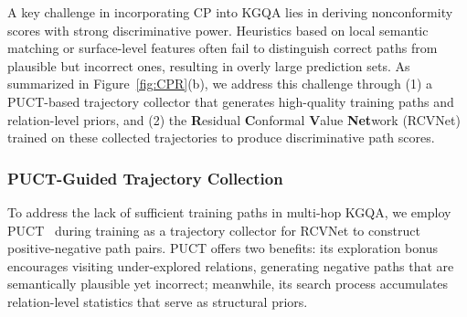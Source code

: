 \documentclass{article}
\newcommand{\sh}[1]{\textcolor{green}{[SH: #1]}}
\theoremstyle{plain}
\theoremstyle{definition}
\theoremstyle{remark}
\begin{document}
A key challenge in incorporating CP into KGQA lies in deriving nonconformity scores with strong discriminative power. Heuristics based on local semantic matching or surface-level features often fail to distinguish correct paths from plausible but incorrect ones, resulting in overly large prediction sets. As summarized in Figure~\ref{fig:CPR}(b), we address this challenge through (1) a PUCT-based trajectory collector that generates high-quality training paths and relation-level priors, and (2) the \textbf{R}esidual \textbf{C}onformal \textbf{V}alue \textbf{Net}work (RCVNet) trained on these collected trajectories to produce discriminative path scores.



\subsubsection{PUCT-Guided Trajectory Collection}
\label{sec:puct}


To address the lack of sufficient training paths in multi-hop KGQA, we employ PUCT~\cite{PUCT} during training as a trajectory collector for RCVNet to construct positive-negative path pairs. PUCT offers two benefits: its exploration bonus encourages visiting under-explored relations, generating negative paths that are semantically plausible yet incorrect; meanwhile, its search process accumulates relation-level statistics that serve as structural priors. 
\end{document}
